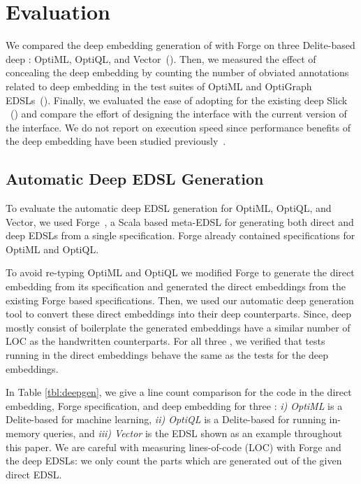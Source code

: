 \section{Evaluation}
\label{sec:evaluation}

We compared the deep embedding generation of \tool with Forge on three Delite-based
 deep \edsls: OptiML, OptiQL, and Vector~().
Then, we measured the effect of concealing the deep embedding by counting the
number of obviated annotations related to deep embedding in the test suites of OptiML
and OptiGraph EDSLs~(). Finally, we evaluated the ease
of adopting \tool for the existing deep \edsl Slick~\cite{slick}
~() and compare the effort of designing the interface with
the current version of the interface. We do not report on execution speed since performance
benefits of the deep embedding have been studied previously~\cite{rompf_optimizing_2013,forge}.

\subsection{Automatic Deep EDSL Generation}
\label{subsec:eval-deepgen}

To evaluate the automatic deep EDSL generation for OptiML, OptiQL, and Vector,
we used Forge~\cite{forge}, a Scala based meta-EDSL for generating both direct
and deep EDSLs from a single specification. Forge already contained
specifications for OptiML and OptiQL.

To avoid re-typing OptiML and OptiQL we modified Forge to generate the direct
embedding from its specification and generated the direct embeddings
from the existing Forge based \edsl specifications. Then, we used our automatic deep
generation tool to convert these direct embeddings into their deep
counterparts. Since, deep \edsls mostly consist of boilerplate the generated
embeddings have a similar number of LOC as the handwritten counterparts. For all
three \edsls, we verified that tests running in the direct embeddings behave the
same as the tests for the deep embeddings.

In Table \ref{tbl:deepgen}, we give a line count comparison for the code in
the direct embedding, Forge specification, and deep embedding for three \edsls:
\emph{i) OptiML} is a Delite-based \edsl for machine learning,
\emph{ii) OptiQL} is a Delite-based \edsl for running in-memory queries, and
\emph{iii) Vector} is the EDSL shown as an example throughout this paper.
We are careful with measuring lines-of-code (LOC) with Forge and the deep EDSLs: we only
count the parts which are generated out of the given direct EDSL.

